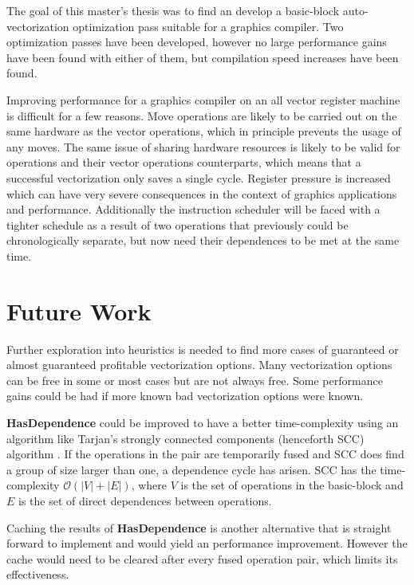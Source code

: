 \documentclass[12pt,a4paper,onecolumn,twoside,openright]{report}
\begin{document}
The goal of this master's thesis was to find an develop a basic-block auto-vectorization optimization pass suitable for a graphics compiler. Two optimization passes have been developed, however no large performance gains have been found with either of them, but compilation speed increases have been found.

Improving performance for a graphics compiler on an all vector register machine is difficult for a few reasons. Move operations are likely to be carried out on the same hardware as the vector operations, which in principle prevents the usage of any moves. The same issue of sharing hardware resources is likely to be valid for operations and their vector operations counterparts, which means that a successful vectorization only saves a single cycle. Register pressure is increased which can have very severe consequences in the context of graphics applications and performance. Additionally the instruction scheduler will be faced with a tighter schedule as a result of two operations that previously could be chronologically separate, but now need their dependences to be met at the same time.

\section{Future Work}

Further exploration into heuristics is needed to find more cases of guaranteed or almost guaranteed profitable vectorization options. Many vectorization options can be free in some or most cases but are not always free. Some performance gains could be had if more known bad vectorization options were known.

\textbf{HasDependence} could be improved to have a better time-complexity using an algorithm like Tarjan's strongly connected components (henceforth SCC) algorithm \cite{tarjan1972depth}. If the operations in the pair are temporarily fused and SCC does find a group of size larger than one, a dependence cycle has arisen. SCC has the time-complexity $\mathcal{O}(|V| + |E|)$, where $V$ is the set of operations in the basic-block and $E$ is the set of direct dependences between operations.

Caching the results of \textbf{HasDependence} is another alternative that is straight forward to implement and would yield an performance improvement. However the cache would need to be cleared after every fused operation pair, which limits its effectiveness.





\newpage
{} \label{bibl}

\end{document}
